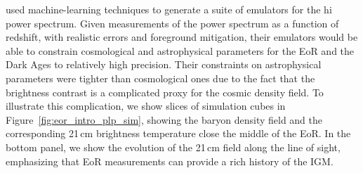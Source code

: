 \cite{Kern.17} used machine-learning techniques to generate a suite of emulators for the {\sc hi} power spectrum. Given measurements of the power spectrum as a function of redshift, with realistic errors and foreground mitigation, their emulators would be able to constrain cosmological and astrophysical parameters for the EoR and the Dark Ages to relatively high precision. Their constraints on astrophysical parameters were tighter than cosmological ones due to the fact that the brightness contrast is a complicated proxy for the cosmic density field. To illustrate this complication, we show slices of simulation cubes in Figure~\ref{fig:eor_intro_plp_sim}, showing the baryon density field and the corresponding 21\,cm brightness temperature close the middle of the EoR. In the bottom panel, we show the evolution of the 21\,cm field along the line of sight, emphasizing that EoR measurements can provide a rich history of the IGM.

